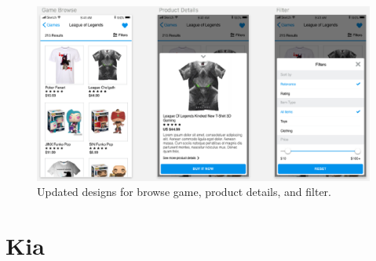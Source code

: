 \documentclass[onecolumn, draftclsnofoot,10pt, compsoc]{IEEEtran}
\begin{document}
\begin{figure}[H]
\centering
\captionsetup{justification=centering}
\includegraphics[scale=.50]{browse_game}
\caption{Updated designs for browse game, product details, and filter.}
\end{figure}

\section{Kia}
\end{document}
